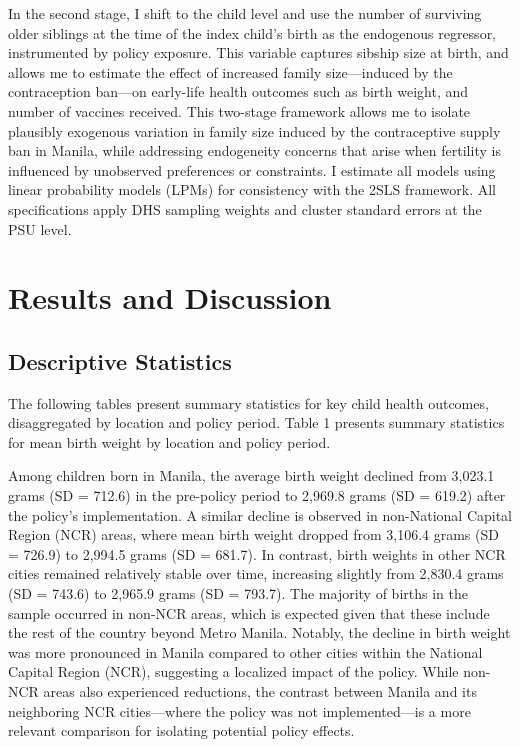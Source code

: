 \documentclass[]{AEA}
\begin{document}
In the second stage, I shift to the child level and use the number of
surviving older siblings at the time of the index child's birth as the
endogenous regressor, instrumented by policy exposure. This variable
captures sibship size at birth, and allows me to estimate the effect of
increased family size---induced by the contraception ban---on early-life
health outcomes such as birth weight, and number of vaccines received.
This two-stage framework allows me to isolate plausibly exogenous
variation in family size induced by the contraceptive supply ban in
Manila, while addressing endogeneity concerns that arise when fertility
is influenced by unobserved preferences or constraints. I estimate all
models using linear probability models (LPMs) for consistency with the
2SLS framework. All specifications apply DHS sampling weights and
cluster standard errors at the PSU level.

\section{Results and Discussion}

\subsection{Descriptive Statistics}

The following tables present summary statistics for key child health
outcomes, disaggregated by location and policy period. Table 1 presents
summary statistics for mean birth weight by location and policy period.



Among children born in Manila, the average birth weight declined from
3,023.1 grams (SD = 712.6) in the pre-policy period to 2,969.8 grams (SD
= 619.2) after the policy's implementation. A similar decline is
observed in non-National Capital Region (NCR) areas, where mean birth
weight dropped from 3,106.4 grams (SD = 726.9) to 2,994.5 grams (SD =
681.7). In contrast, birth weights in other NCR cities remained
relatively stable over time, increasing slightly from 2,830.4 grams (SD
= 743.6) to 2,965.9 grams (SD = 793.7). The majority of births in the
sample occurred in non-NCR areas, which is expected given that these
include the rest of the country beyond Metro Manila. Notably, the
decline in birth weight was more pronounced in Manila compared to other
cities within the National Capital Region (NCR), suggesting a localized
impact of the policy. While non-NCR areas also experienced reductions,
the contrast between Manila and its neighboring NCR cities---where the
policy was not implemented---is a more relevant comparison for isolating
potential policy effects.
\end{document}
